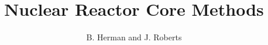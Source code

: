 \documentclass[graybox,envcountchap,sectrefs]{svmono}
\begin{document}
\author{B. Herman and J. Roberts}
\title{Nuclear Reactor Core Methods}
\maketitle

\frontmatter%






\tableofcontents




\mainmatter%


























\backmatter%

% 
\printindex

\end{document}
